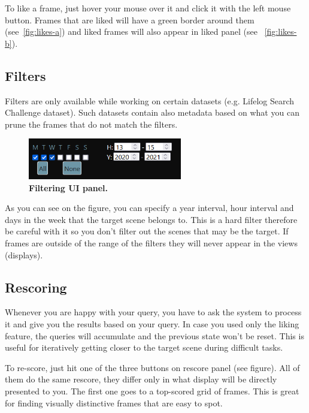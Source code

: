 To like a frame, just hover your mouse over it and click it with the left mouse button. Frames that are liked will have a green border around them (see~\cref{fig:likes-a}) and liked frames will also appear in liked panel (see ~\cref{fig:likes-b}).

\subsection{Filters}
Filters are only available while working on certain datasets (e.g. Lifelog Search Challenge dataset). Such datasets contain also metadata based on what you can prune the frames that do not match the filters.

\begin{figure}[h]
	\centering
	\includegraphics[width=0.6\textwidth]{img/filters.png}
  \caption{\textbf{Filtering UI panel.}}
	\label{fig:filters}
\end{figure}

As you can see on the figure, you can specify a year interval, hour interval and days in the week that the target scene belongs to. This is a hard filter therefore be careful with it so you don't filter out the scenes that may be the target. If frames are outside of the range of the filters they will never appear in the views (displays).


\subsection{Rescoring}
Whenever you are happy with your query, you have to ask the system to process it and give you the results based on your query. In case you used only the liking feature, the queries will accumulate and the previous state won't be reset. This is useful for iteratively getting closer to the target scene during difficult tasks.

To re-score, just hit one of the three buttons on rescore panel (see figure). All of them do the same rescore, they differ only in what display will be directly presented to you. 
The first one goes to a top-scored grid of frames. This is great for finding visually distinctive frames that are easy to spot.

